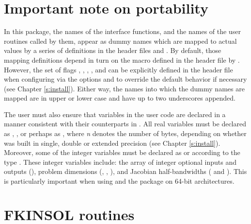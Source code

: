 \section{Important note on portability}

In this package, the names of the interface functions, and the names of
the {\F} user routines called by them, appear as dummy names
which are mapped to actual values by a series of definitions in the
header files and .
By default, those mapping definitions depend in turn on the {\C} macro
 defined in the header file  by . However,
the set of flags , ,
, , and
 can be explicitly defined in the header file
 when
configuring {\sundials} via the options  and
 to override the default behavior if necessary
(see Chapter \ref{s:install}). Either way, the names into which the dummy names
are mapped are in upper or lower case and have up to two underscores appended.

The user must also ensure that variables in the user {\F} code are
declared in a manner consistent with their counterparts in {\kinsol}.
All real variables must be declared as , ,
or perhaps as , where {\em n} denotes the number of bytes,
depending on whether {\kinsol} was built in single, double or extended precision 
(see Chapter \ref{s:install}). Moreover, some of the {\F} integer variables
must be declared as  or  according to the 
{\C} type . These integer variables include: the array
of integer optional inputs and outputs (), problem dimensions (,
, ), and Jacobian half-bandwidths ( and ).
This is particularly important when using
{\kinsol} and the {\fkinsol} package on 64-bit architectures.

\section{FKINSOL routines}\label{sss:fkinroutines}

